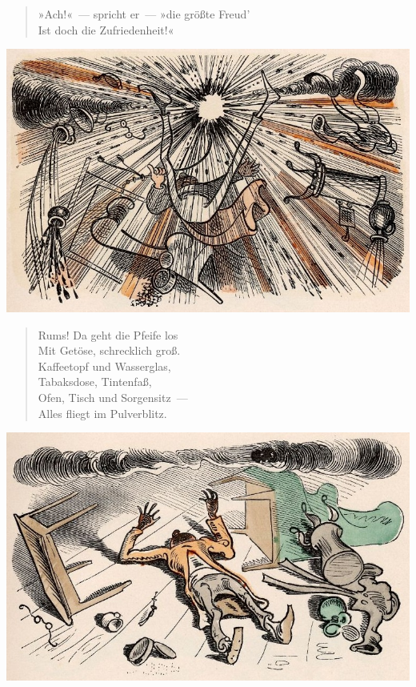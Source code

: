 \documentclass[a4paper,12pt]{article}
\begin{document}
\begin{verse}
»Ach!«~— spricht er~— »die größte Freud'\\{}
Ist doch die Zufriedenheit!«
\end{verse}



\begin{center}\includegraphics[scale=.7, alt={Rums!}]{images/4-08.jpg}\end{center}



\begin{verse}
Rums! Da geht die Pfeife los\\{}
Mit Getöse, schrecklich groß.\\{}
Kaffeetopf und Wasserglas,\\{}
Tabaksdose, Tintenfaß,\\{}
Ofen, Tisch und Sorgensitz~—\\{}
Alles fliegt im Pulverblitz.
\end{verse}



\begin{center}\includegraphics[scale=.7, alt={Lebend auf dem Rücken}]{images/4-09.jpg}\end{center}
\end{document}
